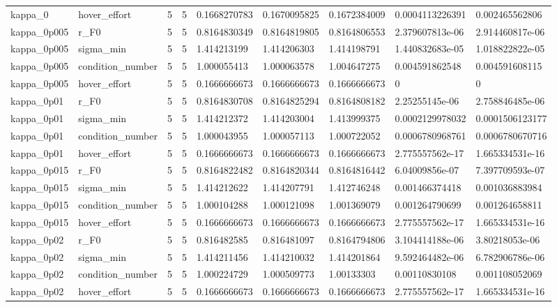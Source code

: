 \begin{tabular}{@{}lllllllll@{}}
kappa\_0 & hover\_effort & 5 & 5 & 0.1668270783 & 0.1670095825 & 0.1672384009 & 0.0004113226391 & 0.002465562806 \\
kappa\_0p005 & r\_F0 & 5 & 5 & 0.8164830349 & 0.8164819805 & 0.8164806553 & 2.379607813e-06 & 2.914460817e-06 \\
kappa\_0p005 & sigma\_min & 5 & 5 & 1.414213199 & 1.414206303 & 1.414198791 & 1.440832683e-05 & 1.018822822e-05 \\
kappa\_0p005 & condition\_number & 5 & 5 & 1.000055413 & 1.000063578 & 1.004647275 & 0.004591862548 & 0.004591608115 \\
kappa\_0p005 & hover\_effort & 5 & 5 & 0.1666666673 & 0.1666666673 & 0.1666666673 & 0 & 0 \\
kappa\_0p01 & r\_F0 & 5 & 5 & 0.8164830708 & 0.8164825294 & 0.8164808182 & 2.25255145e-06 & 2.758846485e-06 \\
kappa\_0p01 & sigma\_min & 5 & 5 & 1.414212372 & 1.414203004 & 1.413999375 & 0.0002129978032 & 0.0001506123177 \\
kappa\_0p01 & condition\_number & 5 & 5 & 1.000043955 & 1.000057113 & 1.000722052 & 0.0006780968761 & 0.0006780670716 \\
kappa\_0p01 & hover\_effort & 5 & 5 & 0.1666666673 & 0.1666666673 & 0.1666666673 & 2.775557562e-17 & 1.665334531e-16 \\
kappa\_0p015 & r\_F0 & 5 & 5 & 0.8164822482 & 0.8164820344 & 0.8164816442 & 6.04009856e-07 & 7.397709593e-07 \\
kappa\_0p015 & sigma\_min & 5 & 5 & 1.414212622 & 1.414207791 & 1.412746248 & 0.001466374418 & 0.001036883984 \\
kappa\_0p015 & condition\_number & 5 & 5 & 1.000104288 & 1.000121098 & 1.001369079 & 0.001264790699 & 0.001264658811 \\
kappa\_0p015 & hover\_effort & 5 & 5 & 0.1666666673 & 0.1666666673 & 0.1666666673 & 2.775557562e-17 & 1.665334531e-16 \\
kappa\_0p02 & r\_F0 & 5 & 5 & 0.816482585 & 0.816481097 & 0.8164794806 & 3.104414188e-06 & 3.80218053e-06 \\
kappa\_0p02 & sigma\_min & 5 & 5 & 1.414211456 & 1.414210032 & 1.414201864 & 9.592464482e-06 & 6.782906786e-06 \\
kappa\_0p02 & condition\_number & 5 & 5 & 1.000224729 & 1.000509773 & 1.00133303 & 0.00110830108 & 0.001108052069 \\
kappa\_0p02 & hover\_effort & 5 & 5 & 0.1666666673 & 0.1666666673 & 0.1666666673 & 2.775557562e-17 & 1.665334531e-16 \\

\end{tabular}
